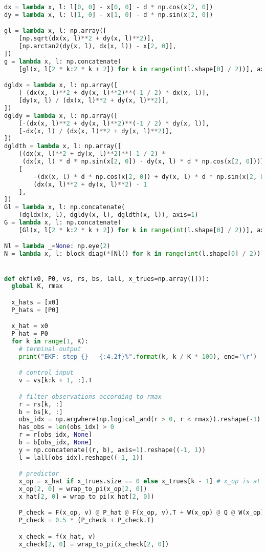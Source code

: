 \documentclass[a4paper]{article}
\begin{document}
\begin{lstlisting}[language=Python, basicstyle=\small]
dx = lambda x, l: l[0, 0] - x[0, 0] - d * np.cos(x[2, 0])
dy = lambda x, l: l[1, 0] - x[1, 0] - d * np.sin(x[2, 0])

gl = lambda x, l: np.array([
    [np.sqrt(dx(x, l)**2 + dy(x, l)**2)],
    [np.arctan2(dy(x, l), dx(x, l)) - x[2, 0]],
])
g = lambda x, l: np.concatenate(
    [gl(x, l[2 * k:2 * k + 2]) for k in range(int(l.shape[0] / 2))], axis=0)

dgldx = lambda x, l: np.array([
    [-(dx(x, l)**2 + dy(x, l)**2)**(-1 / 2) * dx(x, l)],
    [dy(x, l) / (dx(x, l)**2 + dy(x, l)**2)],
])
dgldy = lambda x, l: np.array([
    [-(dx(x, l)**2 + dy(x, l)**2)**(-1 / 2) * dy(x, l)],
    [-dx(x, l) / (dx(x, l)**2 + dy(x, l)**2)],
])
dgldth = lambda x, l: np.array([
    [(dx(x, l)**2 + dy(x, l)**2)**(-1 / 2) *
     (dx(x, l) * d * np.sin(x[2, 0]) - dy(x, l) * d * np.cos(x[2, 0]))],
    [
        -(dx(x, l) * d * np.cos(x[2, 0]) + dy(x, l) * d * np.sin(x[2, 0])) /
        (dx(x, l)**2 + dy(x, l)**2) - 1
    ],
])
Gl = lambda x, l: np.concatenate(
    (dgldx(x, l), dgldy(x, l), dgldth(x, l)), axis=1)
G = lambda x, l: np.concatenate(
    [Gl(x, l[2 * k:2 * k + 2]) for k in range(int(l.shape[0] / 2))], axis=0)

Nl = lambda _=None: np.eye(2)
N = lambda x, l: block_diag(*[Nl() for k in range(int(l.shape[0] / 2))])


def ekf(x0, P0, vs, rs, bs, lall, x_trues=np.array([])):
  global K, rmax

  x_hats = [x0]
  P_hats = [P0]

  x_hat = x0
  P_hat = P0
  for k in range(1, K):
    # terminal output
    print("EKF: step {} - {:4.2f}%".format(k, k / K * 100), end='\r')

    # control input
    v = vs[k:k + 1, :].T

    # filter observations according to rmax
    r = rs[k, :]
    b = bs[k, :]
    obs_idx = np.argwhere(np.logical_and(r > 0, r < rmax)).reshape(-1)
    has_obs = len(obs_idx) > 0
    r = r[obs_idx, None]
    b = b[obs_idx, None]
    y = np.concatenate((r, b), axis=1).reshape((-1, 1))
    l = lall[obs_idx].reshape((-1, 1))

    # predictor
    x_op = x_hat if x_trues.size == 0 else x_trues[k - 1] # x_op is at k-1
    x_op[2, 0] = wrap_to_pi(x_op[2, 0])
    x_hat[2, 0] = wrap_to_pi(x_hat[2, 0])

    P_check = F(x_op, v) @ P_hat @ F(x_op, v).T + W(x_op) @ Q @ W(x_op).T
    P_check = 0.5 * (P_check + P_check.T)

    x_check = f(x_hat, v)
    x_check[2, 0] = wrap_to_pi(x_check[2, 0])


\end{lstlisting}
\end{document}

